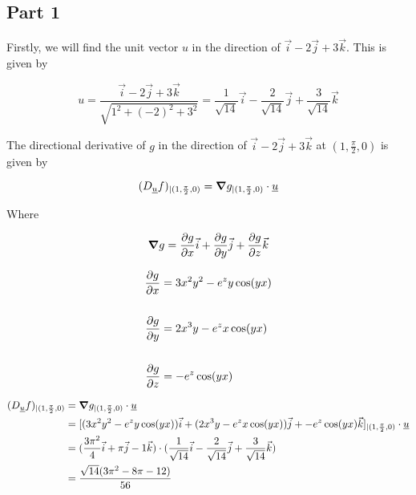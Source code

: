 \documentclass[12pt]{article} %
\begin{document}
\begin{homeworkProblem}
    \subsection*{Part 1}


    Firstly, we will find the unit vector $u$ in the direction of $\vec{i} - 2\vec{j} + 3\vec{k}$. This is given by

    $$
        u
        = \frac{\vec{i} - 2\vec{j} + 3\vec{k}}{\sqrt{1^2 + (-2)^2 + 3^2}}
        = \frac{1}{\sqrt{14}}\vec{i} - \frac{2}{\sqrt{14}}\vec{j} + \frac{3}{\sqrt{14}}\vec{k}
    $$

    The directional derivative of $g$ in the direction of $\vec{i} - 2\vec{j} + 3\vec{k}$ at $(1, \frac{\pi}{2}, 0)$ is given by

    $$
        (D_{\underline{u}}f)_{\mid (1, \frac{\pi}{2}, 0)} = \gradient g_{\mid (1, \frac{\pi}{2}, 0)} \cdot \underline{u}
    $$

    Where

    $$
        \gradient g = \pderiv{g}{x} \vec{i} + \pderiv{g}{y} \vec{j} + \pderiv{g}{z} \vec{k}
    $$

    \begin{align*}
        \frac{\partial g}{\partial x} & = 3x^2y^2 - e^zy\cos(yx) \\ \\
        \frac{\partial g}{\partial y} & = 2x^3y - e^zx\cos(yx)   \\ \\
        \frac{\partial g}{\partial z} & = - e^z\cos(yx)
    \end{align*}


    \begin{align*}
        (D_{\underline{u}}f)_{\mid (1, \frac{\pi}{2}, 0)}
         & = \gradient g_{\mid (1, \frac{\pi}{2}, 0)} \cdot \underline{u}                                                                                     \\
         & = [(3x^2y^2 - e^zy\cos(yx)) \vec{i} + (2x^3y - e^zx\cos(yx)) \vec{j} + - e^z\cos(yx) \vec{k}]_{\mid (1, \frac{\pi}{2}, 0)} \cdot \underline{u}     \\
         & = (\frac{3 \pi^2}{4} \vec{i}+ \pi \vec{j}- 1 \vec{k}) \cdot (\frac{1}{\sqrt{14}}\vec{i} - \frac{2}{\sqrt{14}}\vec{j} + \frac{3}{\sqrt{14}}\vec{k}) \\
         & = \frac{\sqrt{14} ( 3\pi^2 -8\pi - 12)}{56}
    \end{align*}


\end{homeworkProblem}
\end{document}

